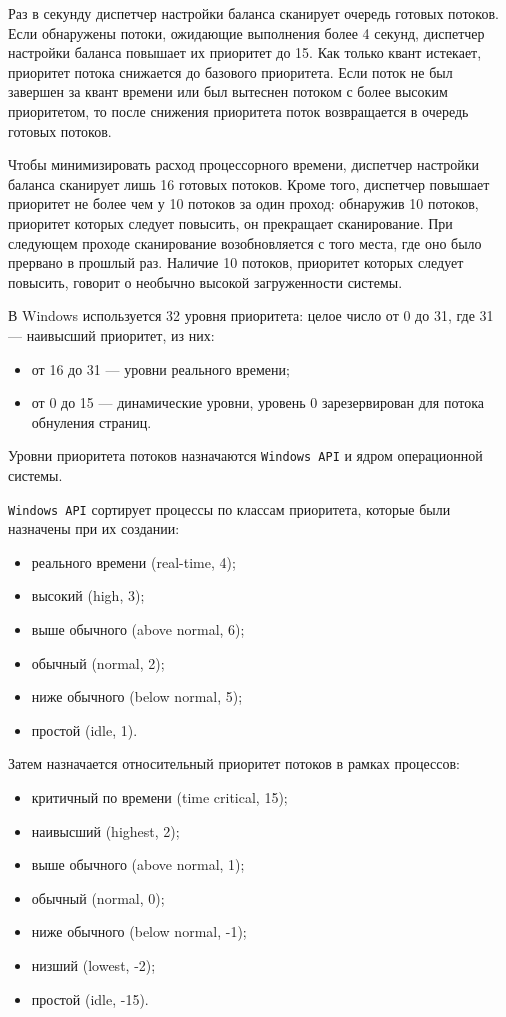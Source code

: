 Раз в секунду диспетчер настройки баланса сканирует очередь готовых потоков. Если обнаружены потоки, ожидающие выполнения более 4 секунд, диспетчер настройки баланса повышает их приоритет до 15. Как только квант истекает, приоритет потока снижается до базового приоритета. Если поток не был завершен за квант времени или был вытеснен потоком с более высоким приоритетом, то после снижения приоритета поток возвращается в очередь готовых потоков.

Чтобы минимизировать расход процессорного времени, диспетчер настройки баланса сканирует лишь 16 готовых потоков. Кроме того, диспетчер повышает приоритет не более чем у 10 потоков за один проход: обнаружив 10 потоков, приоритет которых следует повысить, он прекращает сканирование. При следующем проходе сканирование возобновляется с того места, где оно было прервано в прошлый раз. Наличие 10 потоков, приоритет которых следует повысить, говорит о необычно высокой загруженности системы.


В Windows используется 32 уровня приоритета: целое число от 0 до 31, где 31 --- наивысший приоритет, из них:
\begin{itemize}
    \item от 16 до 31 --- уровни реального времени;
    \item от 0 до 15 --- динамические уровни, уровень 0 зарезервирован для потока обнуления страниц.
\end{itemize}

Уровни приоритета потоков назначаются \texttt{Windows API} и ядром операционной системы.

\texttt{Windows API} сортирует процессы по классам приоритета, которые были назначены при их создании:
\begin{itemize}
    \item реального времени (real-time, 4);
    \item высокий (high, 3);
    \item выше обычного (above normal, 6);
    \item обычный (normal, 2);
    \item ниже обычного (below normal, 5);
    \item простой (idle, 1).
\end{itemize}

Затем назначается относительный приоритет потоков в рамках процессов:

\begin{itemize}
    \item критичный по времени (time critical, 15);
    \item наивысший (highest, 2);
    \item выше обычного (above normal, 1);
    \item обычный (normal, 0);
    \item ниже обычного (below normal, -1);
    \item низший (lowest, -2);
    \item простой (idle, -15).
\end{itemize}

